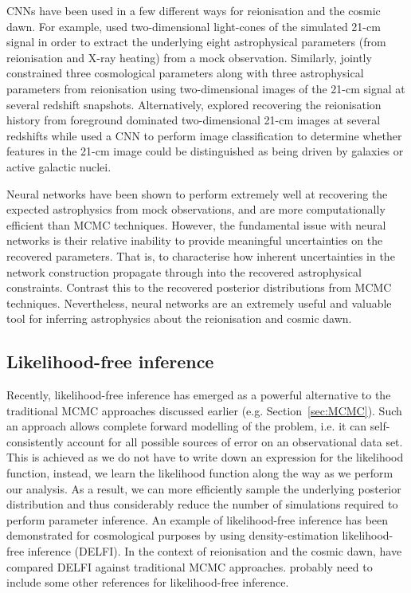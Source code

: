 CNNs have been used in a few different ways for reionisation and the cosmic dawn. For example, \cite{Gillet:2019} used two-dimensional light-cones of the simulated 21-cm signal in order to extract the underlying eight astrophysical parameters (from reionisation and X-ray heating) from a mock observation. Similarly, \cite{Hassan:2019b} jointly constrained three cosmological parameters along with three astrophysical parameters from reionisation using two-dimensional images of the 21-cm signal at several redshift snapshots.  Alternatively, \cite{LaPlante:2018} explored recovering the reionisation history from foreground dominated two-dimensional 21-cm images at several redshifts while \cite{Hassan:2019a} used a CNN to perform image classification to determine whether features in the 21-cm image could be distinguished as being driven by galaxies or active galactic nuclei.

Neural networks have been shown to perform extremely well at recovering the expected astrophysics from mock observations, and are more computationally efficient than MCMC techniques. However, the fundamental issue with neural networks is their relative inability to provide meaningful uncertainties on the recovered parameters. That is, to characterise how inherent uncertainties in the network construction propagate through into the recovered astrophysical constraints. Contrast this to the recovered posterior distributions from MCMC techniques. Nevertheless, neural networks are an extremely useful and valuable tool for inferring astrophysics about the reionisation and cosmic dawn.

\subsection{Likelihood-free inference}

Recently, likelihood-free inference has emerged as a powerful alternative to the traditional MCMC approaches discussed earlier (e.g. Section~\ref{sec:MCMC}). Such an approach allows complete forward modelling of the problem, i.e. it can self-consistently account for all possible sources of error on an observational data set. This is achieved as we do not have to write down an expression for the likelihood function, instead, we learn the likelihood function along the way as we perform our analysis. As a result, we can more efficiently sample the underlying posterior distribution and thus considerably reduce the number of simulations required to perform parameter inference. An example of likelihood-free inference has been demonstrated for cosmological purposes by \cite{Alsing:2019} using density-estimation likelihood-free inference (DELFI). In the context of reionisation and the cosmic dawn, \cite{Watkinson:2019inprep} have compared DELFI against traditional MCMC approaches. {\color{red} probably need to include some other references for likelihood-free inference}.





